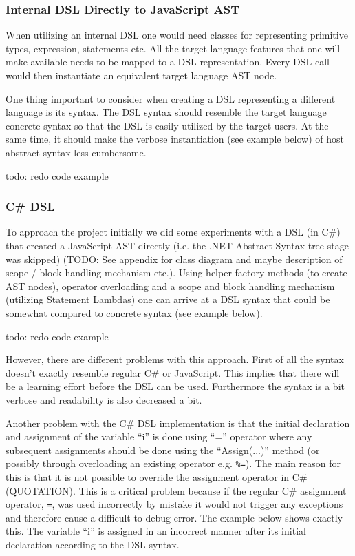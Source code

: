 		\subsubsection{Internal DSL Directly to JavaScript AST} %
		\label{sub:internal_dsl_directly_to_javascript_ast}
		
			When utilizing an internal DSL one would need classes for representing primitive types, expression, statements etc. All the target language features that one will make available needs to be mapped to a DSL representation. Every DSL call would then instantiate an equivalent target language AST node.

			One thing important to consider when creating a DSL representing a different language is its syntax. The DSL syntax should resemble the target language concrete syntax so that the DSL is easily utilized by the target users. At the same time, it should make the verbose instantiation (see example below) of host abstract syntax less cumbersome.

			todo: redo code example


		\subsubsection{C\# DSL} %
		\label{sub:cs_dsl}

			To approach the project initially we did some experiments with a DSL (in C\#) that created a JavaScript AST directly (i.e. the .NET Abstract Syntax tree stage was skipped) (TODO: See appendix for class diagram and maybe description of scope / block handling mechanism etc.). Using helper factory methods (to create AST nodes), operator overloading and a scope and block handling mechanism (utilizing Statement Lambdas) one can arrive at a DSL syntax that could be somewhat compared to concrete syntax (see example below).

			todo: redo code example

			However, there are different problems with this approach. First of all the syntax doesn't exactly resemble regular C\# or JavaScript. This implies that there will be a learning effort before the DSL can be used. Furthermore the syntax is a bit verbose and readability is also decreased a bit.

			Another problem with the C\# DSL implementation is that the initial declaration and assignment of the variable ``i'' is done using ``='' operator where any subsequent assignments should be done using the ``Assign(...)'' method (or possibly through overloading an existing operator e.g. \texttt{\%=}). The main reason for this is that it is not possible to override the assignment operator in C\# (QUOTATION). This is a critical problem because if the regular C\# assignment operator, \texttt{=}, was used incorrectly by mistake it would not trigger any exceptions and therefore cause a difficult to debug error.  The example below shows exactly this. The variable ``i'' is assigned in an incorrect manner after its initial declaration according to the DSL syntax.

